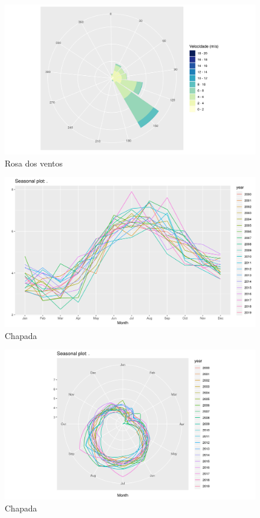 \documentclass[
	12pt,				%
	openright,			%
	oneside,			%
	a4paper,			%
	english,			%
	french,				%
	spanish,			%
	brazil				%
	]{abntex2}
\begin{document}
\begin{figure}[h]
    \centering
	\includegraphics[width=\textwidth]{windrose}
	\caption{Rosa dos ventos}
\end{figure}
\FloatBarrier

\begin{figure}[h]
    \centering
	\includegraphics[width=\textwidth]{season_plot}
	\caption{Chapada}
\end{figure}
\FloatBarrier

\begin{figure}[h]
    \centering
	\includegraphics[width=\textwidth]{season_plot_polar}
	\caption{Chapada}
\end{figure}
\FloatBarrier
\end{document}
